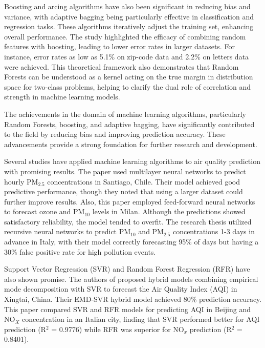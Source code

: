 \documentclass{book}
\numberwithin{equation}{section}
\numberwithin{figure}{section}
\begin{document}
Boosting and arcing algorithms have also been significant in reducing bias and variance, with adaptive bagging being particularly effective in classification and regression tasks. These algorithms iteratively adjust the training set, enhancing overall performance. The study highlighted the efficacy of combining random features with boosting, leading to lower error rates in larger datasets. For instance, error rates as low as 5.1\% on zip-code data and 2.2\% on letters data were achieved. This theoretical framework also demonstrates that Random Forests can be understood as a kernel acting on the true margin in distribution space for two-class problems, helping to clarify the dual role of correlation and strength in machine learning models.

The achievements in the domain of machine learning algorithms, particularly Random Forests, boosting, and adaptive bagging, have significantly contributed to the field by reducing bias and improving prediction accuracy. These advancements provide a strong foundation for further research and development.

Several studies have applied machine learning algorithms to air quality prediction with promising results. The paper \citep{perez2000prediction} used multilayer neural networks to predict hourly PM$_{2.5}$ concentrations in Santiago, Chile. Their model achieved good predictive performance, though they noted that using a larger dataset could further improve results. Also, this paper \citep{corani2005air} employed feed-forward neural networks to forecast ozone and PM$_{10}$ levels in Milan. Although the predictions showed satisfactory reliability, the model tended to overfit. The research thesis \citep{biancofiore2017recursive} utilized recursive neural networks to predict PM$_{10}$ and PM$_{2.5}$ concentrations 1-3 days in advance in Italy, with their model correctly forecasting 95\% of days but having a 30\% false positive rate for high pollution events.

Support Vector Regression (SVR) and Random Forest Regression (RFR) have also shown promise. The authors of \citep{zhu2017daily} proposed hybrid models combining empirical mode decomposition with SVR to forecast the Air Quality Index (AQI) in Xingtai, China. Their EMD-SVR hybrid model achieved 80\% prediction accuracy. This paper \citep{liu2019air} compared SVR and RFR models for predicting AQI in Beijing and NO$_X$ concentration in an Italian city, finding that SVR performed better for AQI prediction (R$^2$ = 0.9776) while RFR was superior for NO$_x$ prediction (R$^2$ = 0.8401).
\end{document}
